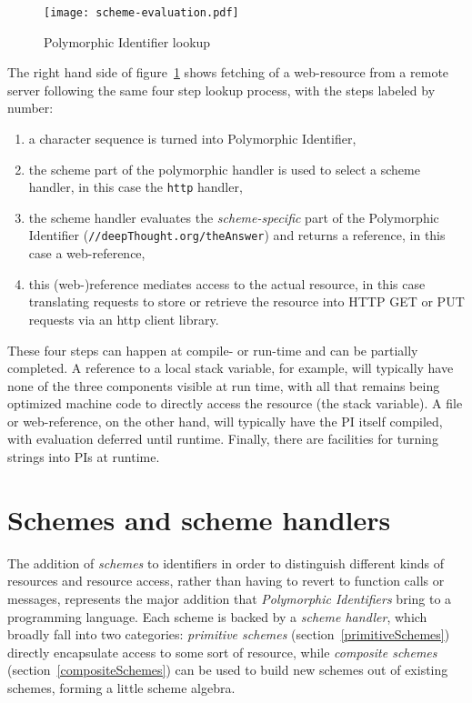 \documentclass[preprint,authoryear]{llncs}
\begin{document}
\begin{figure}[htbp]
\begin{center}
\texttt{[image: scheme-evaluation.pdf]}
\caption{Polymorphic Identifier lookup}
\label{scheme-eval}
\end{center}
\end{figure}


The right hand side of figure~\ref{scheme-eval} shows fetching of a web-resource from
a remote server following the same four step lookup process, with the steps labeled by
number:

\begin{enumerate}
\item a character sequence is turned into  Polymorphic Identifier,
\item the scheme part of the polymorphic handler is used to select a scheme handler, in this case the {\tt http} handler,
\item the scheme handler evaluates the \emph{scheme-specific} part of the Polymorphic Identifier ({\tt //deepThought.org/theAnswer})
	 and returns a reference, in this case a web-reference,
\item this (web-)reference mediates access to the actual resource, in this case translating requests to store or retrieve the 
	resource into HTTP GET or PUT requests via an http client library.
\end{enumerate}

These four steps can happen at compile- or run-time and can be partially completed.
A reference to a local stack variable, for example, will typically have none of the
three components visible at run time, with all that remains being optimized 
machine code to directly access the resource (the stack variable).
A file or web-reference, on the other hand, will typically have the PI itself
compiled, with evaluation deferred until runtime.  Finally, there are facilities
for turning strings into PIs at runtime.


\section{Schemes and scheme handlers}
\label{schemes}
The addition of \emph{schemes} to identifiers in order to distinguish different kinds of resources
and resource access, rather than having to revert to function calls or messages, represents
the major addition that \emph{Polymorphic Identifiers} bring to a programming language.
Each scheme is backed by a \emph{scheme handler}, which broadly fall into two categories:
 \emph{primitive schemes} (section~\ref{primitiveSchemes})
directly encapsulate access to some sort of resource, while \emph{composite schemes} (section~\ref{compositeSchemes})
can be used to build new schemes out of existing schemes, forming a little scheme algebra.
\end{document}
